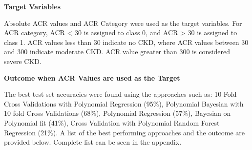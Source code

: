 \medskip 
\noindent \textbf{Target Variables}


\noindent Absolute ACR values and ACR Category were used as the target variables.  For ACR category, ACR < 30 is assigned to class 0, and ACR > 30 is assigned to class 1. ACR values less than 30 indicate no CKD, where ACR values between 30 and 300 indicate moderate CKD. ACR value greater than 300 is considered severe CKD.

\medskip 
\noindent \textbf{Outcome when ACR Values are used as the Target }


\noindent The best test set accuracies were found using the approaches such as: 10 Fold Cross Validations with Polynomial Regression (95\%), Polynomial Bayesian with 10 fold Cross Validations (68\%), Polynomial Regression (57\%), Bayesian on Polynomial fit (41\%), Cross Validation with Polynomial Random Forest Regression (21\%). A list of the best performing approaches and the outcome are provided below. Complete list can be seen in the appendix. 

\medskip

